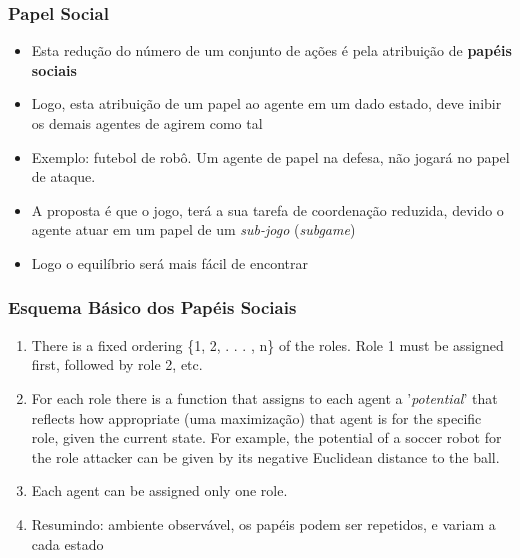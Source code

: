 \begin{frame}
\frametitle{Papel Social}

\begin{itemize}
  \item Esta redução do número de um conjunto de ações é pela atribuição de \textbf{papéis sociais}
  \item Logo, esta  atribuição de um papel ao agente em um dado estado, deve inibir os demais agentes
  de agirem como tal
  \item Exemplo: futebol de robô. Um agente de papel na defesa, não jogará no  papel de ataque. 
  
  \item A proposta é que o jogo, terá a sua tarefa de coordenação reduzida, devido o agente atuar em um papel de um \textit{sub-jogo} (\textit{subgame})
  
  \item Logo o equilíbrio será mais fácil de encontrar

\end{itemize}

\end{frame}

\begin{frame}%
\frametitle{Esquema Básico dos Papéis Sociais}


\begin{enumerate}
  \item There is a fixed ordering \{1, 2, . . . , n\} of the roles. Role 1 must be assigned first, followed by role 2, etc.
  
\item  For each role there is a function that assigns to each agent a '\textit{potential}' that reflects how appropriate (uma maximização) that agent is for the specific role, given the current state. For example, the
potential of a soccer robot for the role attacker can be given by its negative Euclidean distance to the ball.

\item  Each agent can be assigned only one role. 

\item Resumindo: ambiente observável, os papéis podem ser repetidos, e variam a cada estado

\end{enumerate}

\end{frame}

